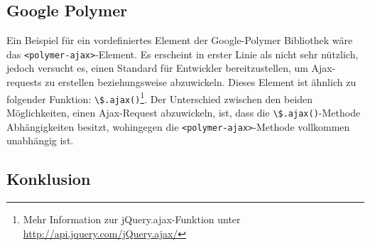 \subsection{Google Polymer}
\label{sec:3_Polymer}




\iffalse
In general, Polymer is a framework that aims to use (and show how to use) Web Components. It's foundation is Custom Elements (e.g. everything you build is a web component) and it evolves as the web evolves. To that end, we only support the latest version of the modern browsers.

I'll use this image to describe Polymer's entire architecture stack:

RED layer: We get tomorrow's web through a set of polyfills. Keep in mind, those libraries go away over time as browsers adopt the new APIs.

YELLOW layer: Sprinkle in some sugar with polymer.js. This layer is our opinion on how to use the spec'd APIs, together. It also adds things like data-binding, syntatic sugar, change watchers, published properties...We think these things are helpful for building web component-based apps.

GREEN: The comprehensive set of UI components (green layer) is still in progress. These will be web components that use all of the red + yellow layers.


How is Polymer different from Angular JS Directive? (Fundamentally and technologically)

Polymer (and more correctly, Shadow DOM) create the ability to not only compose bits of HTML, but to encapsulate them as well. This is a fundamentally new capability and one that can be used with any other templating system or framework to enhance their power.

In terms of templating/interpolation, Polymer uses MDV which does bi-directional data binding in a similar way to Angular for older browsers, but in newer runtimes can take advantage of Mutation Observers and eventually Object.observe() to help speed up change detection and propagation.
\fi



Ein Beispiel für ein vordefiniertes Element der Google-Polymer Bibliothek wäre das \lstinline|<polymer-ajax>|-Element. Es erscheint in erster Linie als nicht sehr nützlich, jedoch versucht es, einen Standard für Entwickler bereitzustellen, um Ajax-requests zu erstellen beziehungsweise abzuwickeln. Dieses Element ist ähnlich zu folgender Funktion: \lstinline|\$.ajax()|\footnote{Mehr Information zur jQuery.ajax-Funktion unter \href{http://api.jquery.com/jQuery.ajax/}{http://api.jquery.com/jQuery.ajax/}}. Der Unterschied zwischen den beiden Möglichkeiten, einen Ajax-Request abzuwickeln, ist, dass die \lstinline|\$.ajax()|-Methode Abhängigkeiten besitzt, wohingegen die \lstinline|<polymer-ajax>|-Methode vollkommen unabhängig ist.

\subsection{Konklusion}
\label{sec:3_Konklusion}



